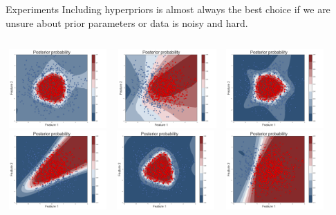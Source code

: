 \documentclass{beamer}
\begin{document}
\begin{frame}{Experiments}
	Including hyperpriors is almost always the best choice if we are unsure about prior parameters or data is noisy and hard.
	\begin{columns}[t]
		\centering
		\includegraphics[width=4cm,height=3cm]{pres_pics/h_cauchy.png}\ \includegraphics[width=4cm,height=3cm]{pres_pics/p_cauchy.png}
		\centering
		\includegraphics[width=4cm,height=3cm]{pres_pics/h_gauss.png}\    \includegraphics[width=4cm,height=3cm]{pres_pics/p_gauss.png}
		\centering
		\includegraphics[width=4cm,height=3cm]{pres_pics/h_laplace.png}\    \includegraphics[width=4cm,height=3cm]{pres_pics/p_laplace.png}
	\end{columns}
\end{frame}
\end{document}
